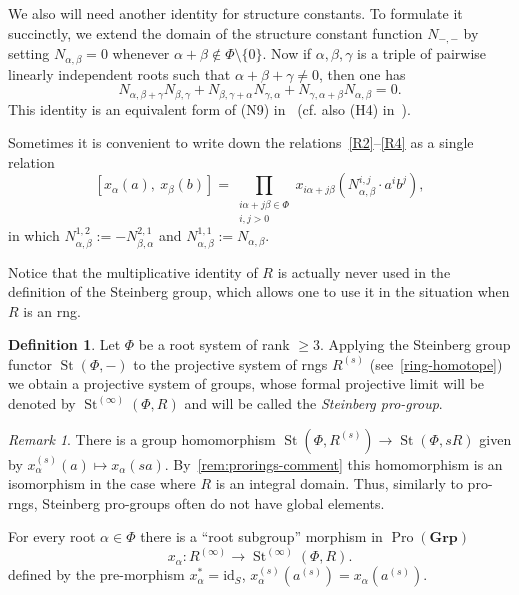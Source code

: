 \documentclass[oneside, 11pt]{amsart}
\numberwithin{equation}{section}
\theoremstyle{definition}
\newtheorem{df}[lemma]{Definition} \Crefname{df}{Definition}{Definitions}
\theoremstyle{remark}
\newtheorem{rem}[lemma]{Remark}
\DeclareMathOperator\St{St}
\DeclareMathOperator{\Pro}{Pro}
\newcommand{\Group}{\mathbf{Grp}}
\begin{document}
We also will need another identity for structure constants.
To formulate it succinctly, we extend the domain of the structure constant function $N_{-,-}$ by setting $N_{\alpha, \beta} = 0$ whenever $\alpha+\beta\not\in\Phi\setminus\{0\}$.
Now if $\alpha, \beta, \gamma$ is a triple of pairwise linearly independent roots such that $\alpha+\beta+\gamma\neq 0$, then one has 
\begin{equation}\label{eq:cocycle2} N_{\alpha,\beta+\gamma} N_{\beta,\gamma} + N_{\beta,\gamma+\alpha} N_{\gamma,\alpha} + N_{\gamma,\alpha+\beta}N_{\alpha,\beta} = 0. \end{equation}
This identity is an equivalent form of (N9) in~\cite[\S~14]{VP} (cf. also (H4) in~\cite{Re75}).

Sometimes it is convenient to write down the relations~\eqref{R2}--\eqref{R4} as a single relation
\begin{equation}\label{eq:R234} [x_\alpha(a),\ x_\beta(b)] = \prod\limits_{\substack{i\alpha + j\beta\in\Phi \\ i,j >0}} x_{i\alpha + j\beta}(N_{\alpha,\beta}^{i,j} \cdot a^i b^j), \end{equation}
in which $N^{1,2}_{\alpha,\beta} := -N^{2,1}_{\beta, \alpha}$ and $N^{1,1}_{\alpha,\beta}:=N_{\alpha,\beta}$.

Notice that the multiplicative identity of $R$ is actually never used in the definition of the Steinberg group, 
 which allows one to use it in the situation when $R$ is an rng.
\begin{df}\label{def:Steinberg-homotope}
 Let %
 $\Phi$ be a root system of rank $\geq 3$. Applying the Steinberg group functor $\St(\Phi, -)$ to the projective system of rngs $R^{(s)}$ (see~\cref{ring-homotope}) we obtain a projective system of groups, whose formal projective limit will be denoted by $\St^{(\infty)}(\Phi, R)$ and will be called the {\it Steinberg pro-group}. 
\end{df}

\begin{rem} \label{rem:pro-Steinberg-comment}
There is a group homomorphism $\St(\Phi, R^{(s)}) \to \St(\Phi, sR)$ given by $x_\alpha^{(s)}(a)\mapsto x_\alpha(sa)$. By~\cref{rem:prorings-comment} this homomorphism is an isomorphism in the case where $R$ is an integral domain. Thus, similarly to pro-rngs, Steinberg pro-groups often do not have global elements.
\end{rem}
 
For every root $\alpha \in \Phi$ there is a ``root subgroup'' morphism in $\Pro(\Group)$
\[x_{\alpha} \colon R^{(\infty)} \to \St^{(\infty)}(\Phi, R).\] 
defined by the pre-morphism $x_\alpha^* = \mathrm{id}_S$, $x_\alpha^{(s)}(a^{(s)}) = x_\alpha(a^{(s)})$.
\end{document}
